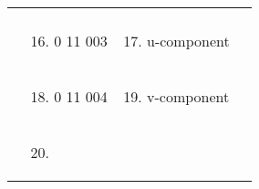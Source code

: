 \begin{longtable}[]{@{}llll@{}}
\begin{minipage}[t]{0.22\columnwidth}
\end{minipage} & \begin{minipage}[t]{0.22\columnwidth}\raggedright
\strut
\end{minipage}\tabularnewline
\begin{minipage}[t]{0.22\columnwidth}\raggedright
\strut
\end{minipage} & \begin{minipage}[t]{0.22\columnwidth}\raggedright
\begin{enumerate}
\setcounter{enumi}{15}
\item
  0 11 003
\end{enumerate}\strut
\end{minipage} & \begin{minipage}[t]{0.22\columnwidth}\raggedright
\begin{enumerate}
\setcounter{enumi}{16}
\item
  u-component
\end{enumerate}\strut
\end{minipage} & \begin{minipage}[t]{0.22\columnwidth}\raggedright
\strut
\end{minipage}\tabularnewline
\begin{minipage}[t]{0.22\columnwidth}\raggedright
\strut
\end{minipage} & \begin{minipage}[t]{0.22\columnwidth}\raggedright
\begin{enumerate}
\setcounter{enumi}{17}
\item
  0 11 004
\end{enumerate}\strut
\end{minipage} & \begin{minipage}[t]{0.22\columnwidth}\raggedright
\begin{enumerate}
\setcounter{enumi}{18}
\item
  v-component
\end{enumerate}\strut
\end{minipage} & \begin{minipage}[t]{0.22\columnwidth}\raggedright
\strut
\end{minipage}\tabularnewline
\begin{minipage}[t]{0.22\columnwidth}\raggedright
\strut
\end{minipage} & \begin{minipage}[t]{0.22\columnwidth}\raggedright
\begin{enumerate}
\setcounter{enumi}{19}
\item

\end{enumerate}
\end{minipage}
\end{longtable}
